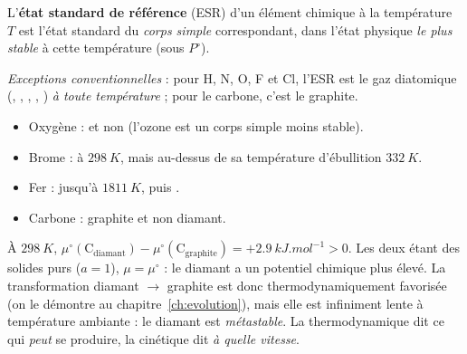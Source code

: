 \begin{definition}
L'\textbf{état standard de référence} (ESR) d'un élément chimique à la température $T$ est l'état standard du \emph{corps simple} correspondant, dans l'état physique \emph{le plus stable} à cette température (sous $P^\circ$).

\noindent\emph{Exceptions conventionnelles} : pour H, N, O, F et Cl, l'ESR est le gaz diatomique (, , , , ) \emph{à toute température} ; pour le carbone, c'est le graphite.
\end{definition}

\begin{exemple}
\begin{itemize}
  \item Oxygène :  et non  (l'ozone est un corps simple moins stable).
  \item Brome :  à $\SI{298}{K}$, mais  au-dessus de sa température d'ébullition $\SI{332}{K}$.
  \item Fer :  jusqu'à $\SI{1811}{K}$, puis .
  \item Carbone : graphite et non diamant.
\end{itemize}
\end{exemple}

\begin{exemple}
À $\SI{298}{K}$, $\mu^\circ(\text{C}_{\text{diamant}}) - \mu^\circ(\text{C}_{\text{graphite}}) = +\SI{2,9}{kJ.mol^{-1}} > 0$. Les deux étant des solides purs ($a = 1$), $\mu = \mu^\circ$ : le diamant a un potentiel chimique plus élevé. La transformation diamant $\to$ graphite est donc thermodynamiquement favorisée (on le démontre au chapitre~\ref{ch:evolution}), mais elle est infiniment lente à température ambiante : le diamant est \emph{métastable}. La thermodynamique dit ce qui \emph{peut} se produire, la cinétique dit \emph{à quelle vitesse}.
\end{exemple}
